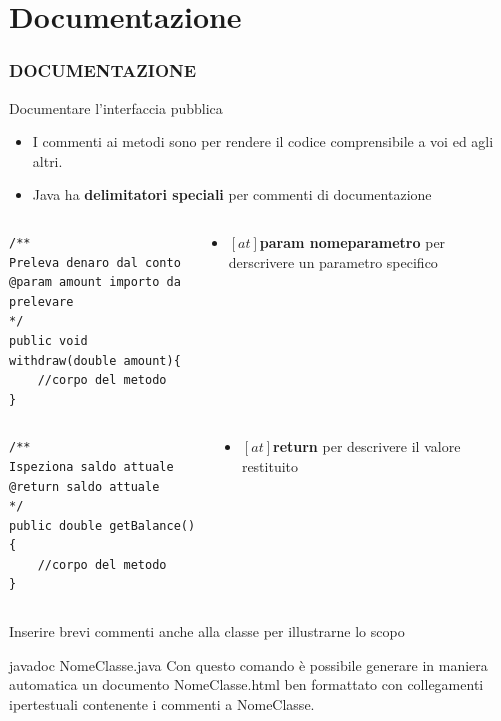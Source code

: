 \section*{Documentazione}
\begin{frame}[fragile]
\frametitle{DOCUMENTAZIONE}
\begin{block}{Documentare l'interfaccia pubblica}
\begin{itemize}
\item I commenti ai metodi sono \textbf{} per rendere il codice comprensibile a voi ed agli altri.
\item Java ha \textbf{\alert{delimitatori speciali}} per commenti di documentazione
\end{itemize}
\end{block}
\begin{columns}
\begin{column}{.5\textwidth}
\begin{lstlisting}
/**
Preleva denaro dal conto
@param amount importo da prelevare
*/
public void withdraw(double amount){
    //corpo del metodo
}
\end{lstlisting}
\end{column}
\begin{column}{.5\textwidth}
\begin{itemize}
\item \textbf{$\left[at\right]$param nomeparametro} per derscrivere un parametro specifico
\end{itemize}
\end{column}
\end{columns}
\end{frame}

\begin{frame}[fragile]
\begin{columns}
\begin{column}{.5\textwidth}
\begin{lstlisting}
/**
Ispeziona saldo attuale
@return saldo attuale
*/
public double getBalance(){
    //corpo del metodo
}
\end{lstlisting}
\end{column}
\begin{column}{.5\textwidth}
\begin{itemize}
\item \textbf{$\left[at\right]$return} per descrivere il valore restituito
\end{itemize}
\end{column}
\end{columns}
\begin{block}{}
Inserire brevi commenti anche alla classe per illustrarne lo scopo
\end{block}
\begin{block}{javadoc NomeClasse.java}
Con questo comando è possibile generare in maniera automatica un documento NomeClasse.html ben formattato con collegamenti ipertestuali
contenente i commenti a NomeClasse.
\end{block}
\end{frame}

